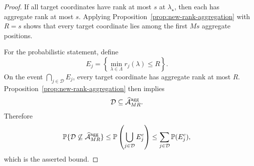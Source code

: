\begin{proof}
If all target coordinates have rank at most $s$ at
$\lambda_\star$, then each has aggregate rank at most $s$. Applying
Proposition~\ref{prop:new-rank-aggregation} with $R=s$ shows that every
target coordinate lies among the first $Ms$ aggregate positions.

For the probabilistic statement, define
\[
 E_j=\left\{\min_{\lambda\in\Lambda}r_j(\lambda)\le R\right\}.
\]
On the event $\bigcap_{j\in\mathcal D}E_j$, every target coordinate has
aggregate rank at most $R$. Proposition~\ref{prop:new-rank-aggregation}
then implies
\[
 \mathcal D\subseteq\widehat{\mathcal A}^{\rm agg}_{MR}.
\]
Therefore
\[
 \mathbb P\{\mathcal D\not\subseteq
 \widehat{\mathcal A}^{\rm agg}_{MR}\}
 \le
 \mathbb P\left(\bigcup_{j\in\mathcal D}E_j^c\right)
 \le
 \sum_{j\in\mathcal D}\mathbb P(E_j^c),
\]
which is the asserted bound.
\end{proof}
